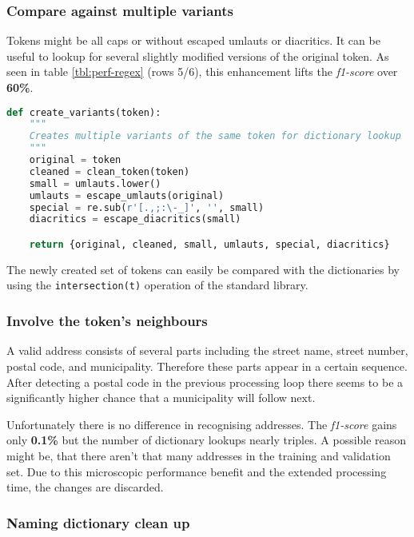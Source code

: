 \subsubsection{Compare against multiple variants}

Tokens might be all caps or without escaped umlauts or \gls{diacritic}s. It can be useful to lookup for several slightly modified versions of the original token. As
seen in table \ref{tbl:perf-regex} (rows 5/6), this enhancement lifts the \emph{f1-score} over \textbf{60\%}.

\begin{lstlisting}[language=Python, label={code:regex-variants}, caption=Creating different variants of a single token]
def create_variants(token):
    """
    Creates multiple variants of the same token for dictionary lookup
    """
    original = token
    cleaned = clean_token(token)
    small = umlauts.lower()
    umlauts = escape_umlauts(original)
    special = re.sub(r'[.,;:\-_]', '', small)
    diacritics = escape_diacritics(small)

    return {original, cleaned, small, umlauts, special, diacritics}
\end{lstlisting}

The newly created set of tokens can easily be compared with the dictionaries by using the \verb|intersection(t)| operation of the standard library.

\subsubsection{Involve the token's neighbours}

A valid address consists of several parts including the street name, street number, postal code, and municipality. Therefore these parts appear in a certain
sequence. After detecting a postal code in the previous processing loop there seems to be a significantly higher chance that a municipality will follow next.

Unfortunately there is no difference in recognising addresses. The \emph{f1-score} gains only \textbf{0.1\%} but the number of dictionary lookups nearly triples.
A possible reason might be, that there aren't that many addresses in the training and validation set. Due to this microscopic performance benefit and the extended
processing time, the changes are discarded.

\subsubsection{Naming dictionary clean up}

